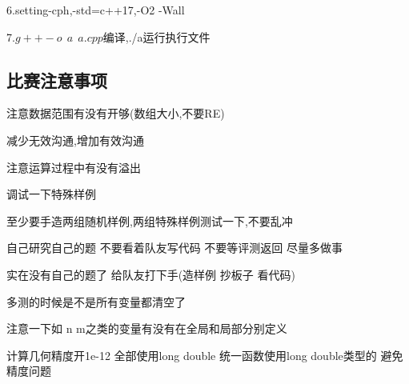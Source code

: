 \documentclass[a4paper]{ctexart}
\begin{document}
6.setting-cph,-std=c++17,-O2 -Wall

7.${g++ -o \ \ a \ \ a.cpp }$编译,./a运行执行文件

\subsection{比赛注意事项}

注意数据范围有没有开够(数组大小,不要RE)

减少无效沟通,增加有效沟通

注意运算过程中有没有溢出

调试一下特殊样例

至少要手造两组随机样例,两组特殊样例测试一下,不要乱冲

自己研究自己的题 不要看着队友写代码 不要等评测返回 尽量多做事

实在没有自己的题了 给队友打下手(造样例 抄板子 看代码)

多测的时候是不是所有变量都清空了

注意一下如 n m之类的变量有没有在全局和局部分别定义

计算几何精度开1e-12 全部使用long double 统一函数使用long double类型的 避免精度问题
\end{document}
